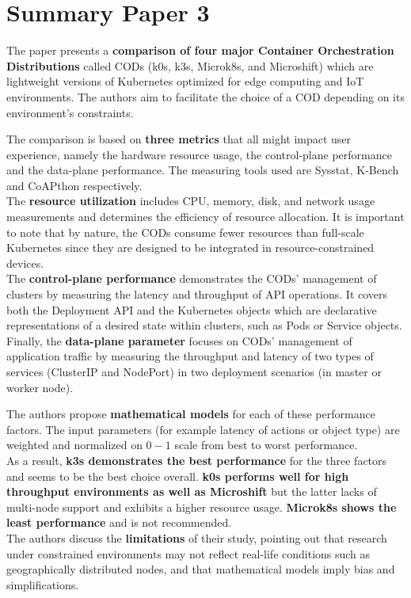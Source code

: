 \section{Summary Paper 3}%
\label{sec:Summary Paper 3}

The paper \cite{C3} presents a \textbf{comparison of four major Container Orchestration Distributions} called CODs (k0s, k3s, Microk8s, and Microshift) which are lightweight versions of Kubernetes optimized for edge computing and IoT environments. The authors aim to facilitate the choice of a COD depending on its environment's constraints.

The comparison is based on \textbf{three metrics} that all might impact user experience, namely the hardware resource usage, the control-plane performance and the data-plane performance. The measuring tools used are Sysstat, K-Bench and CoAPthon respectively. \\
The \textbf{resource utilization} includes CPU, memory, disk, and network usage measurements and determines the efficiency of resource allocation. It is important to note that by nature, the CODs consume fewer resources than full-scale Kubernetes since they are designed to be integrated in resource-constrained devices. \\
The \textbf{control-plane performance} demonstrates the CODs' management of clusters by measuring the latency and throughput of API operations. It covers both the Deployment API and the Kubernetes objects which are declarative representations of a desired state within clusters, such as Pods or Service objects.\\
Finally, the \textbf{data-plane parameter} focuses on CODs' management of application traffic by measuring the throughput and latency of two types of services (ClusterIP and NodePort) in two deployment scenarios (in master or worker node). 

The authors propose \textbf{mathematical models} for each of these performance factors. The input parameters (for example latency of actions or object type) are weighted and normalized on $0-1$ scale from best to worst performance. \\
As a result, \textbf{k3s demonstrates the best performance} for the three factors and seems to be the best choice overall. \textbf{k0s performs well for high throughput environments as well as Microshift} but the latter lacks of multi-node support and exhibits a higher resource usage. \textbf{Microk8s shows the least performance} and is not recommended. \\
The authors discuss the \textbf{limitations} of their study, pointing out that research under constrained environments may not reflect real-life conditions such as geographically distributed nodes, and that mathematical models imply bias and simplifications. 
